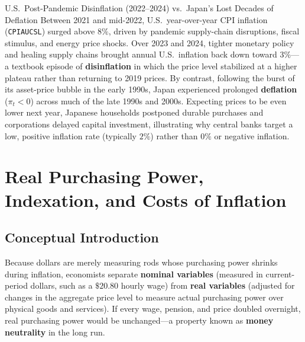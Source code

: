 \documentclass[11pt,letterpaper]{article}
\begin{document}
\begin{examplecase}{U.S.\ Post-Pandemic Disinflation (2022--2024) vs.\ Japan's Lost Decades of Deflation}
Between 2021 and mid-2022, U.S.\ year-over-year CPI inflation (\texttt{CPIAUCSL}) surged above $8\%$, driven by pandemic supply-chain disruptions, fiscal stimulus, and energy price shocks. Over 2023 and 2024, tighter monetary policy and healing supply chains brought annual U.S.\ inflation back down toward $3\%$—a textbook episode of \textbf{disinflation} in which the price level stabilized at a higher plateau rather than returning to 2019 prices. By contrast, following the burst of its asset-price bubble in the early 1990s, Japan experienced prolonged \textbf{deflation} ($\pi_t < 0$) across much of the late 1990s and 2000s. Expecting prices to be even lower next year, Japanese households postponed durable purchases and corporations delayed capital investment, illustrating why central banks target a low, positive inflation rate (typically $2\%$) rather than $0\%$ or negative inflation.
\end{examplecase}

\section{Real Purchasing Power, Indexation, and Costs of Inflation}

\subsection*{Conceptual Introduction}
Because dollars are merely measuring rods whose purchasing power shrinks during inflation, economists separate \textbf{nominal variables} (measured in current-period dollars, such as a $\$20.80$ hourly wage) from \textbf{real variables} (adjusted for changes in the aggregate price level to measure actual purchasing power over physical goods and services). If every wage, pension, and price doubled overnight, real purchasing power would be unchanged—a property known as \textbf{money neutrality} in the long run.
\end{document}
